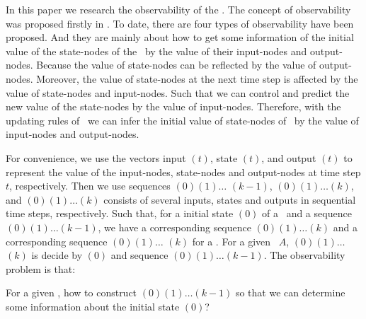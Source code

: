In this paper we research the observability of the \BCNs. The concept of observability was proposed firstly in \cite{cheng2009controllability}. To date, there are four types of observability have been proposed. And they are mainly about how to get some information of the initial value of the state-nodes of the \BCNs\ by the value of their input-nodes and output-nodes. Because the value of state-nodes can be reflected by the value of output-nodes. Moreover, the value of state-nodes at the next time step is affected by the value of state-nodes and input-nodes. Such that we can control and predict the new value of the state-nodes by the value of input-nodes. Therefore, with the updating rules of \BCNs\ we can infer  the initial value of state-nodes of \BCNs\ by the value of input-nodes and output-nodes. %

For convenience, we use the vectors input \Input$(t)$, state \State$(t)$, and output \Output$(t)$ to represent the value of the input-nodes, state-nodes and output-nodes at time step $t$, respectively.
 Then we use   sequences \Input$(0)$\Input$(1)\ldots$
\Input$(k-1)$,  \State$(0) $\State$(1)\ldots$\State$(k)$, and   \Output$(0)$\Output$(1)\ldots$\Output$(k)$ 
 consists of several inputs, states and outputs  in sequential time steps,  respectively. 
 Such that, for a initial state \State$(0)$ of a \BCN\ and a sequence \Input$(0)$\Input$(1)\ldots$\Input$(k-1)$, we have a corresponding  sequence 
\State$(0) $\State$(1)\ldots $\State$(k)$ and a corresponding  sequence \Output$(0) $\Output$(1)\ldots$ \Output$(k)$ for a \BCN.  
For a given  \BCN\  $A$,  \Output$(0) $\Output$(1)\ldots$ \Output$(k)$ is decide by
\State$(0)$ and sequence \Input$(0)$\Input$(1)\ldots$\Input$(k-1)$.
The observability problem is that:
\begin{problem}
\label{pro:1}
For a given  \BCN, how to construct \Input$(0)$\Input$(1)\ldots$\Input$(k-1)$ so that we can determine some information about the initial state \State$(0)$?
\end{problem}

